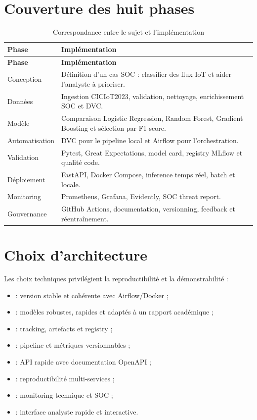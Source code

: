 \section{Couverture des huit phases}
\begin{longtable}{@{}p{3.1cm}p{11cm}@{}}
\caption{Correspondance entre le sujet et l'implémentation}\\
\toprule
\textbf{Phase} & \textbf{Implémentation}\\
\midrule
\endfirsthead
\toprule
\textbf{Phase} & \textbf{Implémentation}\\
\midrule
\endhead
Conception & Définition d'un cas SOC : classifier des flux IoT et aider l'analyste à prioriser.\\
Données & Ingestion CICIoT2023, validation, nettoyage, enrichissement SOC et DVC.\\
Modèle & Comparaison Logistic Regression, Random Forest, Gradient Boosting et sélection par F1-score.\\
Automatisation & DVC pour le pipeline local et Airflow pour l'orchestration.\\
Validation & Pytest, Great Expectations, model card, registry MLflow et qualité code.\\
Déploiement & FastAPI, Docker Compose, inference temps réel, batch et locale.\\
Monitoring & Prometheus, Grafana, Evidently, SOC threat report.\\
Gouvernance & GitHub Actions, documentation, versionning, feedback et réentraînement.\\
\bottomrule
\end{longtable}

\section{Choix d'architecture}
Les choix techniques privilégient la reproductibilité et la démonstrabilité :
\begin{itemize}
  \item {} : version stable et cohérente avec Airflow/Docker ;
  \item {} : modèles robustes, rapides et adaptés à un rapport académique ;
  \item {} : tracking, artefacts et registry ;
  \item {} : pipeline et métriques versionnables ;
  \item {} : API rapide avec documentation OpenAPI ;
  \item {} : reproductibilité multi-services ;
  \item {} : monitoring technique et SOC ;
  \item {} : interface analyste rapide et interactive.
\end{itemize}
